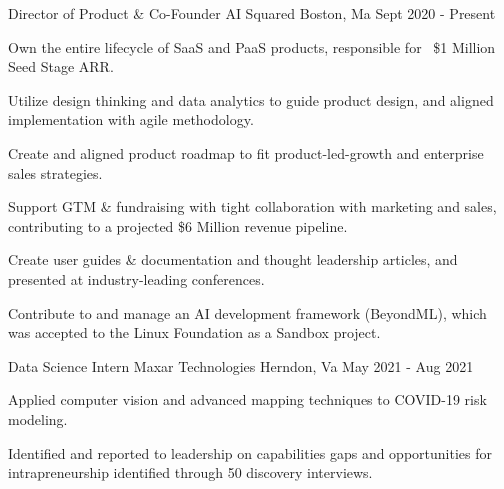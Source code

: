

\begin{cventries}

  \cventry
    {Director of Product \& Co-Founder} %
    {AI Squared} %
    {Boston, Ma} %
    {Sept 2020 - Present} %
    {
      \begin{cvitems} %
        \item{Own the entire lifecycle of SaaS and PaaS products, responsible for ~\$1 Million Seed Stage ARR.}
        \item{Utilize design thinking and data analytics to guide product design, and aligned implementation with agile methodology.}
        \item{Create and aligned product roadmap to fit product-led-growth and enterprise sales strategies.}        
        \item{Support GTM \& fundraising with tight collaboration with marketing and sales, contributing to a projected \$6 Million revenue pipeline.}
        \item{Create user guides \& documentation and thought leadership articles, and presented at industry-leading conferences.}
        \item{Contribute to and manage an AI development framework (BeyondML), which was accepted to the Linux Foundation as a Sandbox project.}
      \end{cvitems}
    }

  \cventry
    {Data Science Intern} %
    {Maxar Technologies} %
    {Herndon, Va} %
    {May 2021 - Aug 2021} %
    {
      \begin{cvitems} %
        \item {Applied computer vision and advanced mapping techniques to COVID-19 risk modeling.}
        \item {Identified and reported to leadership on capabilities gaps and opportunities for intrapreneurship identified through 50 discovery interviews.}
      \end{cvitems}
    }


\end{cventries}
